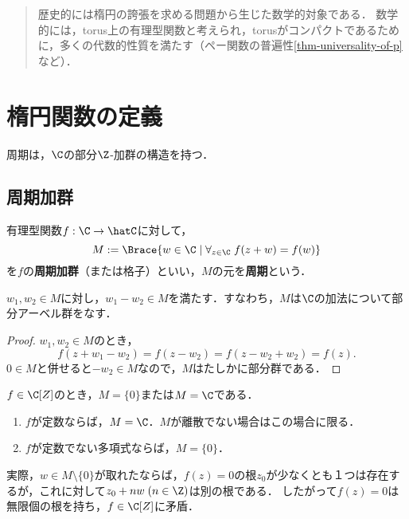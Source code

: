 \documentclass[uplatex, dvipdfmx]{jsreport}
\begin{document}
\begin{quotation}
    歴史的には楕円の誇張を求める問題から生じた数学的対象である．
    数学的には，torus上の有理型関数と考えられ，torusがコンパクトであるために，多くの代数的性質を満たす（ペー関数の普遍性\ref{thm-universality-of-p}など）．
\end{quotation}

\section{楕円関数の定義}

\begin{tcolorbox}[colframe=ForestGreen, colback=ForestGreen!10!white,breakable,colbacktitle=ForestGreen!40!white,coltitle=black,fonttitle=\bfseries\sffamily,
title=]
    周期は，$\C$の部分$\Z$-加群の構造を持つ．
\end{tcolorbox}

\subsection{周期加群}

\begin{definition}[period]
    有理型関数$f:\C\to\hatC$に対して，
    \[M:=\Brace{w\in\C\mid \forall_{z\in\C}\;f(z+w)=f(w)}\]
    を$f$の\textbf{周期加群}（または格子）といい，$M$の元を\textbf{周期}という．
\end{definition}
\begin{lemma}
    $w_1,w_2\in M$に対し，$w_1-w_2\in M$を満たす．すなわち，$M$は$\C$の加法について部分アーベル群をなす．
\end{lemma}
\begin{proof}
    $w_1,w_2\in M$のとき，
    \[f(z+w_1-w_2)=f(z-w_2)=f(z-w_2+w_2)=f(z).\]
    $0\in M$と併せると$-w_2\in M$なので，$M$はたしかに部分群である．
\end{proof}

\begin{example}[多項式の周期]
    $f\in\C[Z]$のとき，$M=\{0\}$または$M=\C$である．
    \begin{enumerate}
        \item $f$が定数ならば，$M=\C$．$M$が離散でない場合はこの場合に限る．
        \item $f$が定数でない多項式ならば，$M=\{0\}$．
    \end{enumerate}
    実際，$w\in M\setminus\{0\}$が取れたならば，$f(z)=0$の根$z_0$が少なくとも１つは存在するが，これに対して$z_0+nw\;(n\in\Z)$は別の根である．
    したがって$f(z)=0$は無限個の根を持ち，$f\in\C[Z]$に矛盾．
\end{example}
\end{document}
